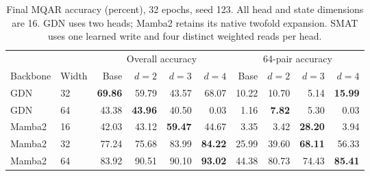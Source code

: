 \begin{table}[t]
\centering
\small
\caption{Final MQAR accuracy (percent), 32 epochs, seed 123. All head and state dimensions are 16. GDN uses two heads; Mamba2 retains its native twofold expansion. SMAT uses one learned write and four distinct weighted reads per head.}
\label{tab:mqar-four-reads-widths}
\begin{tabular}{llrrrrrrrr}
\toprule
 & & \multicolumn{4}{c}{Overall accuracy} & \multicolumn{4}{c}{64-pair accuracy} \\
\cmidrule(lr){3-6}\cmidrule(lr){7-10}
Backbone & Width & Base & $d=2$ & $d=3$ & $d=4$ & Base & $d=2$ & $d=3$ & $d=4$ \\
\midrule
GDN & 32 & \textbf{69.86} & 59.79 & 43.57 & 68.07 & 10.22 & 10.70 & 5.14 & \textbf{15.99} \\
GDN & 64 & 43.38 & \textbf{43.96} & 40.50 & 0.03 & 1.16 & \textbf{7.82} & 5.30 & 0.03 \\
Mamba2 & 16 & 42.03 & 43.12 & \textbf{59.47} & 44.67 & 3.35 & 3.42 & \textbf{28.20} & 3.94 \\
Mamba2 & 32 & 77.24 & 75.68 & 83.99 & \textbf{84.22} & 25.99 & 39.60 & \textbf{68.11} & 56.33 \\
Mamba2 & 64 & 83.92 & 90.51 & 90.10 & \textbf{93.02} & 44.38 & 80.73 & 74.43 & \textbf{85.41} \\
\bottomrule
\end{tabular}
\end{table}
